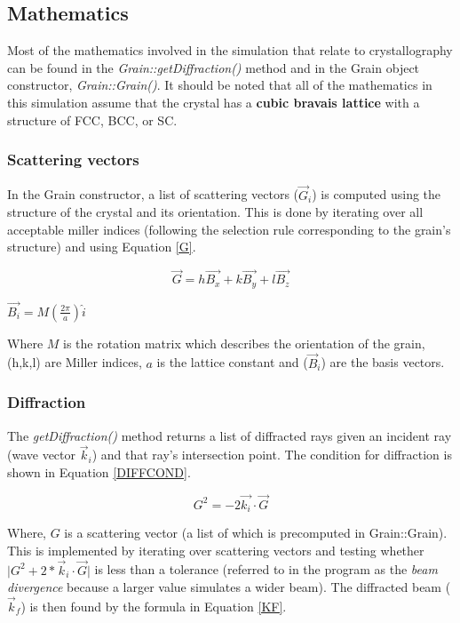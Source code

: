 \documentclass{article}
\begin{document}
\subsection{Mathematics}

Most of the mathematics involved in the simulation that relate to
crystallography can be found in the {\em Grain::getDiffraction()}
method and in the Grain object constructor, {\em Grain::Grain()}. It
should be noted that all of the mathematics in this simulation assume
that the crystal has a {\bf cubic bravais lattice} with a structure of
FCC, BCC, or SC.

\subsubsection{Scattering vectors}
In the Grain constructor, a list of scattering vectors ($\vec G_i$) is computed
using the structure of the crystal and its orientation.  This is done
by iterating over all acceptable miller indices (following the
selection rule corresponding to the grain's structure) and using
Equation \ref{G}.

	\begin{equation} \label{G}
	\vec{G} = h \vec{B_x} + k \vec{B_y} + l \vec{B_z}
	\end{equation}

	\begin{center}
	$\vec{B_i} = M (\frac{2\pi}{a}) \hat i	$ \\
	\end{center}

Where $M$ is the rotation matrix which describes the orientation of
the grain, (h,k,l) are Miller indices, $a$ is the lattice constant and
($\vec B_i$) are the basis vectors.

\subsubsection{Diffraction}
The {\em getDiffraction()} method returns a list of diffracted rays given an
incident ray (wave vector $\vec k_i$) and that ray's intersection point.
The condition for diffraction is shown in Equation \ref{DIFFCOND}.

	\begin{equation} \label{DIFFCOND}
	G^2 = -2 \vec{k_i} \cdot \vec{G} 
	\end{equation} 

Where, $G$ is a scattering vector (a list of which is precomputed in
Grain::Grain). This is implemented by iterating over scattering
vectors and testing whether $ \vert G^2+2*\vec k_i \cdot \vec G \vert $ is less
than a tolerance (referred to in the program as the {\em beam
divergence} because a larger value simulates a wider beam).  The
diffracted beam ($\vec k_f$) is then found by the formula in Equation \ref{KF}.
\end{document}
